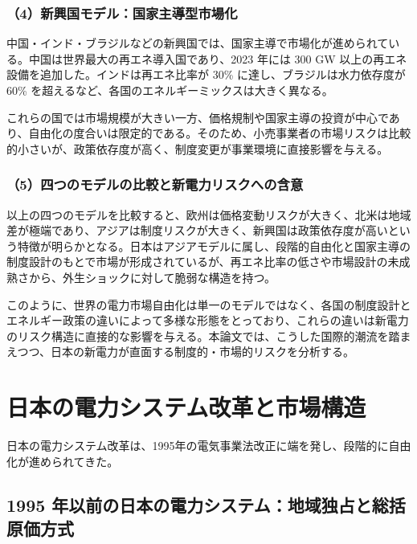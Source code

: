 \subsubsection{（4）新興国モデル：国家主導型市場化}

中国・インド・ブラジルなどの新興国では、国家主導で市場化が進められている。中国は世界最大の再エネ導入国であり、2023 年には 300 GW 以上の再エネ設備を追加した。インドは再エネ比率が 30\% に達し、ブラジルは水力依存度が 60\% を超えるなど、各国のエネルギーミックスは大きく異なる。

これらの国では市場規模が大きい一方、価格規制や国家主導の投資が中心であり、自由化の度合いは限定的である。そのため、小売事業者の市場リスクは比較的小さいが、政策依存度が高く、制度変更が事業環境に直接影響を与える。

\subsubsection{（5）四つのモデルの比較と新電力リスクへの含意}

以上の四つのモデルを比較すると、欧州は価格変動リスクが大きく、北米は地域差が極端であり、アジアは制度リスクが大きく、新興国は政策依存度が高いという特徴が明らかとなる。日本はアジアモデルに属し、段階的自由化と国家主導の制度設計のもとで市場が形成されているが、再エネ比率の低さや市場設計の未成熟さから、外生ショックに対して脆弱な構造を持つ。

このように、世界の電力市場自由化は単一のモデルではなく、各国の制度設計とエネルギー政策の違いによって多様な形態をとっており、これらの違いは新電力のリスク構造に直接的な影響を与える。本論文では、こうした国際的潮流を踏まえつつ、日本の新電力が直面する制度的・市場的リスクを分析する。



\section{日本の電力システム改革と市場構造}

日本の電力システム改革は、1995年の電気事業法改正に端を発し、段階的に自由化が進められてきた\parencite{METI2015Reform}。

\subsection{1995 年以前の日本の電力システム：地域独占と総括原価方式}

